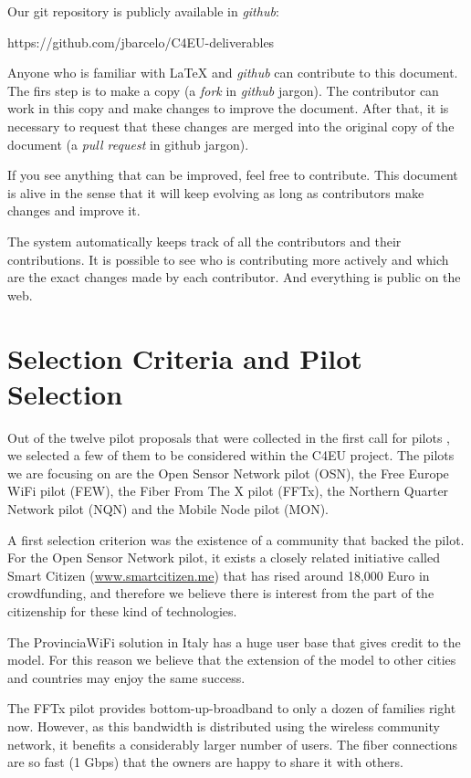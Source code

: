 \documentclass[draftclsnofoot,12pt,journal,onecolumn]{IEEEtran}
\begin{document}
Our git repository is publicly available in \emph{github}:

https://github.com/jbarcelo/C4EU-deliverables

Anyone who is familiar with {\LaTeX} and \emph{github} can contribute to this document.
The firs step is to make a copy (a \emph{fork} in \emph{github} jargon).
The contributor can work in this copy and make changes to improve the document.
After that, it is necessary to request that these changes are merged into the original copy of the document (a \emph{pull request} in github jargon).

If you see anything that can be improved, feel free to contribute.
This document is alive in the sense that it will keep evolving as long as contributors make changes and improve it.

The system automatically keeps track of all the contributors and their contributions. 
It is possible to see who is contributing more actively and which are the exact changes made by each contributor.
And everything is public on the web.

\section{Selection Criteria and Pilot Selection}
\label{sec:selection}

Out of the twelve pilot proposals that were collected in the first call for pilots \cite{barcelo2012bub}, we selected a few of them to be considered within the C4EU project.
The pilots we are focusing on are the Open Sensor Network pilot (OSN), the Free Europe WiFi pilot (FEW), the Fiber From The X pilot (FFTx), the Northern Quarter Network pilot (NQN) and the Mobile Node pilot (MON).

A first selection criterion was the existence of a community that backed the pilot.
For the Open Sensor Network pilot, it exists a closely related initiative called Smart Citizen (\url{www.smartcitizen.me}) that has rised around 18,000 Euro in crowdfunding, and therefore we believe there is interest from the part of the citizenship for these kind of technologies.

The ProvinciaWiFi solution in Italy has a huge user base that gives credit to the model.
For this reason we believe that the extension of the model to other cities and countries may enjoy the same success.

The FFTx pilot provides bottom-up-broadband to only a dozen of families right now.
However, as this bandwidth is distributed using the wireless community network, it benefits a considerably larger number of users.
The fiber connections are so fast (1 Gbps) that the owners are happy to share it with others.
\end{document}
